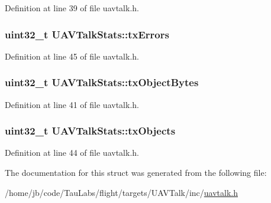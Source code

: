 \-Definition at line 39 of file uavtalk.\-h.

\hypertarget{struct_u_a_v_talk_stats_af325955ebac8f234145deefefdea9dbe}{
\subsubsection[{tx\-Errors}]{\setlength{\rightskip}{0pt plus 5cm}uint32\-\_\-t {\bf \-U\-A\-V\-Talk\-Stats\-::tx\-Errors}}}\label{struct_u_a_v_talk_stats_af325955ebac8f234145deefefdea9dbe}


\-Definition at line 45 of file uavtalk.\-h.

\hypertarget{struct_u_a_v_talk_stats_ad2f1c1147e9062cfeaeaf21ea076434c}{
\subsubsection[{tx\-Object\-Bytes}]{\setlength{\rightskip}{0pt plus 5cm}uint32\-\_\-t {\bf \-U\-A\-V\-Talk\-Stats\-::tx\-Object\-Bytes}}}\label{struct_u_a_v_talk_stats_ad2f1c1147e9062cfeaeaf21ea076434c}


\-Definition at line 41 of file uavtalk.\-h.

\hypertarget{struct_u_a_v_talk_stats_a7f067b3f89c3ac3c274eb05f71557a6a}{
\subsubsection[{tx\-Objects}]{\setlength{\rightskip}{0pt plus 5cm}uint32\-\_\-t {\bf \-U\-A\-V\-Talk\-Stats\-::tx\-Objects}}}\label{struct_u_a_v_talk_stats_a7f067b3f89c3ac3c274eb05f71557a6a}


\-Definition at line 44 of file uavtalk.\-h.



\-The documentation for this struct was generated from the following file\-:\begin{DoxyCompactItemize}
\item 
/home/jb/code/\-Tau\-Labs/flight/targets/\-U\-A\-V\-Talk/inc/\hyperlink{uavtalk_8h}{uavtalk.\-h}\end{DoxyCompactItemize}
